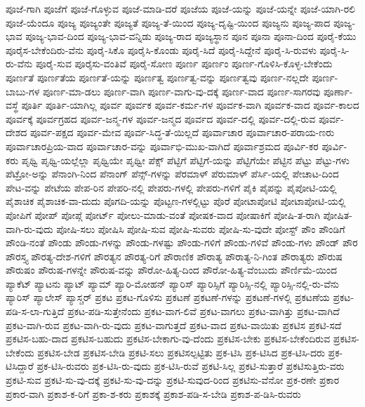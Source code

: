 {ಪೂಜೆ-ಗಾಗಿ
ಪೂಜೆಗೆ
ಪೂಜೆ-ಗೊಳ್ಳುವ
ಪೂಜೆ-ಮಾಡಿ-ದರೆ
ಪೂಜೆಯ
ಪೂಜೆ-ಯನ್ನು
ಪೂಜೆ-ಯನ್ನೇ
ಪೂಜೆ-ಯಾಗಿ-ರಲಿ
ಪೂಜೆ-ಯೆಂದೂ
ಪೂಜ್ಯ
ಪೂಜ್ಯಂತೇ
ಪೂಜ್ಯತೆ
ಪೂಜ್ಯ-ತೆ-ಯಿಂದ
ಪೂಜ್ಯ-ದೃಷ್ಟಿ-ಯಿಂದ
ಪೂಜ್ಯನು
ಪೂಜ್ಯ-ಪಾದ
ಪೂಜ್ಯ-ಭಾವ
ಪೂಜ್ಯ-ಭಾವ-ದಿಂದ
ಪೂಜ್ಯ-ಭಾವ-ವನ್ನಿಡು
ಪೂಜ್ಯ-ರಾದ
ಪೂಜ್ಯಸ್ಥಾನ
ಪೂನ
ಪೂನಾ
ಪೂನಾ-ದಿಂದ
ಪೂರೈ-ಕೆಯು
ಪೂರೈಸ-ಬೇಕೆಂದಿರು-ವೆನು
ಪೂರೈ-ಸಿಕೊ
ಪೂರೈಸಿ-ಕೊಂಡು
ಪೂರೈ-ಸಿದೆ
ಪೂರೈ-ಸಿದ್ದೇನೆ
ಪೂರೈ-ಸಿ-ರುವಳು
ಪೂರೈ-ಸಿ-ರು-ವೆನು
ಪೂರೈ-ಸುವ
ಪೂರೈಸು-ವಂತಿವೆ
ಪೂರೈ-ಸೋಣ
ಪೂರ್ಣ
ಪೂರ್ಣಂ
ಪೂರ್ಣ-ಗೊಳಿಸಿ-ಕೊಳ್ಳ-ಬೇಕೆಂದು
ಪೂರ್ಣತೆ
ಪೂರ್ಣತೆಯ
ಪೂರ್ಣತೆ-ಯನ್ನು
ಪೂರ್ಣತ್ವ
ಪೂರ್ಣತ್ವ-ವನ್ನು
ಪೂರ್ಣತ್ವವು
ಪೂರ್ಣ-ನಲ್ಲದೇ
ಪೂರ್ಣ-ಬಾಬು-ಗಳ
ಪೂರ್ಣ-ಮಾ-ಡಲು
ಪೂರ್ಣ-ವಾಗಿ
ಪೂರ್ಣ-ವಾಗು-ವು-ದಕ್ಕೆ
ಪೂರ್ಣ-ವಾದ
ಪೂರ್ಣ-ಸಾಗರವು
ಪೂರ್ಣಾ-ವಸ್ಥೆ
ಪೂರ್ತಿ
ಪೂರ್ತಿ-ಯಾಗಿಲ್ಲ
ಪೂರ್ವ
ಪೂರ್ವಕ
ಪೂರ್ವ-ಕರ್ಮ-ಗಳ
ಪೂರ್ವಕ-ವಾಗಿ
ಪೂರ್ವಕ-ವಾದ
ಪೂರ್ವ-ಕಾಲದ
ಪೂರ್ವಕ್ಕೆ
ಪೂರ್ವಗ್ರಹದ
ಪೂರ್ವ-ಜನ್ಮ-ಗಳ
ಪೂರ್ವ-ಜನ್ಮದ
ಪೂರ್ವದ
ಪೂರ್ವ-ದಲ್ಲಿ
ಪೂರ್ವ-ದಲ್ಲಿ-ರುವ
ಪೂರ್ವ-ದೇಶದ
ಪೂರ್ವ-ಪಕ್ಷದ
ಪೂರ್ವ-ಮೇವ
ಪೂರ್ವ-ಸಿದ್ಧ-ತೆ-ಯಿಲ್ಲದೆ
ಪೂರ್ವಾಚಾರ
ಪೂರ್ವಾಚಾರ-ಪರಾಯ-ಣರು
ಪೂರ್ವಾಚಾರಪ್ರಿಯ-ವಾದ
ಪೂರ್ವಾಚಾರ-ವನ್ನು
ಪೂರ್ವಾಭಿ-ಮುಖ-ವಾಗಿದೆ
ಪೂರ್ವಾಶ್ರಮದ
ಪೂರ್ವಿ-ಕರ
ಪೂರ್ವಿ-ಕರು
ಪೃಥ್ವಿ
ಪೃಥ್ವಿ-ಯಲ್ಲೆಲ್ಲಾ
ಪೃಥ್ವಿಯೇ
ಪೃಥ್ವೀ
ಪೆಕ್ಸ್
ಪೆಟ್ಟಿಗೆ
ಪೆಟ್ಟಿಗೆ-ಯನ್ನು
ಪೆಟ್ಟಿಗೆಯೇ
ಪೆಟ್ಟಿನ
ಪೆಟ್ಟು
ಪೆಟ್ಟು-ಗಳು
ಪೆಟ್ರೋ-ಅನ್ನು
ಪೆನಾಂಗಿ-ನಿಂದ
ಪೆನಾಂಗ್
ಪೆನ್ಸ್-ಗಳನ್ನು
ಪೆರಮಾಳ್
ಪೆರುಮಾಳ್
ಪೆರ್ಸಿ-ಯಲ್ಲಿ
ಪೇಚಾಟ-ದಿಂದ
ಪೇಟ-ವನ್ನು
ಪೇಟೆಯ
ಪೇಪ-ರಿನ
ಪೇಪರಿ-ನಲ್ಲಿ
ಪೇಪರು-ಗಳಲ್ಲಿ
ಪೇಪರು-ಗಳಿಗೆ
ಪೈಕಿ
ಪೈಪನ್ನು
ಪೈಪೋಟಿ-ಯಲ್ಲಿ
ಪೈಶಾಚಿಕ
ಪೈಶಾಚಿಕ-ವಾ-ದುದು
ಪೊಗದಿ-ಯನ್ನು
ಪೊಟ್ಟಣ-ಗಳಲ್ಲಿಟ್ಟು
ಪೊರೆ
ಪೋಟಾಪೋಟಿ
ಪೋಟಾಪೋಟಿ-ಯಲ್ಲಿ
ಪೋಪಿಗೆ
ಪೋಪ್
ಪೋಪ್ಗೆ
ಪೋರ್ಟ್
ಪೋಲು-ಮಾಡು-ವಂತೆ
ಪೋಷಕ-ವಾದ
ಪೋಷಾಕಿಗೆ
ಪೋಷಿ-ತ-ರಾಗಿ
ಪೋಷಿತ-ವಾಗಿ-ರು-ವುದು
ಪೋಷಿ-ಸಲು
ಪೋಷಿಸಿ
ಪೋಷಿ-ಸುವ
ಪೋಷಿ-ಸುವರು
ಪೋಷಿ-ಸು-ವುದೇ
ಪೋಸ್ಟ್
ಪೌಂ
ಪೌಂಡಿಗೆ
ಪೌಂಡಿ-ನಂತೆ
ಪೌಂಡು
ಪೌಂಡು-ಗಳನ್ನು
ಪೌಂಡು-ಗಳಷ್ಟು
ಪೌಂಡು-ಗಳಿಗೆ
ಪೌಂಡು-ಗಳಿವೆ
ಪೌಂಡು-ಗಳು
ಪೌಂಡ್
ಪೌರ
ಪೌರಸ್ತ್ಯ
ಪೌರತ್ಯ-ದೇಶ-ಗಳಿಗೆ
ಪೌರತ್ಯನ
ಪೌರತ್ಯ-ರಿಗೆ
ಪೌರಾಣಿಕ
ಪೌರಾತ್ಯ
ಪೌರಾತ್ಯ-ನಿ-ಗಿಂತ
ಪೌರಾತ್ಯರು
ಪೌರುಷ
ಪೌರುಷಂ
ಪೌರುಷ-ಗಳನ್ನೇ
ಪೌರುಷ-ವನ್ನು
ಪೌರೋ-ಹಿತ್ಯ-ದಿಂದ
ಪೌರೋ-ಹಿತ್ಯ-ವೆಂಬುದು
ಪೌರ್ಣಿಮೆ-ಯಿಂದ
ಪ್ಯಾಕೆಟ್
ಪ್ಯಾಟನು
ಪ್ಯಾಟ್
ಪ್ಯಾಮ್
ಪ್ಯಾರಿ-ಮೋಹನ್
ಪ್ಯಾರಿಸ್
ಪ್ಯಾರಿಸ್ಸಿಗೆ
ಪ್ಯಾರಿಸ್ಸಿ-ನಲ್ಲಿ
ಪ್ಯಾರಿಸ್ಸಿ-ನಲ್ಲಿ-ರು-ವೆನು
ಪ್ಯಾರಿಸ್
ಪ್ಯಾಲೇಸ್
ಪ್ಯಾಸ್ಚರ್
ಪ್ರಕಟ
ಪ್ರಕಟ-ಗೊಳಿಸು
ಪ್ರಕಟಣೆ
ಪ್ರಕಟಣೆ-ಗಳನ್ನು
ಪ್ರಕಟಣೆ-ಗಳಲ್ಲಿ
ಪ್ರಕಟಣೆಯ
ಪ್ರಕಟ-ಪಡಿ-ಸ-ಲಾ-ಗುತ್ತಿದೆ
ಪ್ರಕಟ-ಪಡಿ-ಸುತ್ತೇನೆಂದು
ಪ್ರಕಟ-ವಾಗ-ಲಿವೆ
ಪ್ರಕಟ-ವಾಗಲು
ಪ್ರಕಟ-ವಾಗಿತ್ತು
ಪ್ರಕಟ-ವಾಗಿದೆ
ಪ್ರಕಟ-ವಾಗಿ-ರುವ
ಪ್ರಕಟ-ವಾಗಿ-ರು-ವುದು
ಪ್ರಕಟ-ವಾಗುತ್ತದೆ
ಪ್ರಕಟ-ವಾದ
ಪ್ರಕಟ-ವಾಯಿತು
ಪ್ರಕಟಿಸ
ಪ್ರಕಟಿ-ಸದೆ
ಪ್ರಕಟಿಸ-ಬಹು-ದಾದ
ಪ್ರಕಟಿಸ-ಬಹುದು
ಪ್ರಕಟಿಸ-ಬೇಕಾಗು-ವು-ದೆಂದು
ಪ್ರಕಟಿಸ-ಬೇಕು
ಪ್ರಕಟಿಸ-ಬೇಕೆಂದಿರುವ
ಪ್ರಕಟಿಸ-ಬೇಕೆಂದು
ಪ್ರಕಟಿಸ-ಬೇಡ
ಪ್ರಕಟಿಸ-ಬೇಡಿ
ಪ್ರಕಟಿ-ಸಲು
ಪ್ರಕಟಿಸಲ್ಪಟ್ಟಿತು
ಪ್ರಕ-ಟಿಸಿ
ಪ್ರಕ-ಟಿಸಿದ
ಪ್ರಕ-ಟಿಸಿ-ದರು
ಪ್ರಕ-ಟಿಸಿದ್ದಾರೆ
ಪ್ರಕ-ಟಿಸಿ-ರುವರು
ಪ್ರಕ-ಟಿಸಿ-ರು-ವುದು
ಪ್ರಕ-ಟಿಸಿ-ರುವೆ
ಪ್ರಕಟಿ-ಸಿಲ್ಲ
ಪ್ರಕಟಿ-ಸುತ್ತಾರೆ
ಪ್ರಕಟಿಸುತ್ತಿರು-ವರು
ಪ್ರಕಟಿ-ಸುವ
ಪ್ರಕಟಿ-ಸು-ವು-ದಕ್ಕೆ
ಪ್ರಕಟಿ-ಸು-ವು-ದನ್ನು
ಪ್ರಕಟಿ-ಸುವುದ-ರಿಂದ
ಪ್ರಕಟಿಸು-ವೆನೋ
ಪ್ರಕ-ರಣೇ
ಪ್ರಕಾರ
ಪ್ರಕಾರ-ವಾಗಿ
ಪ್ರಕಾಶ-ಕ-ರಿಗೆ
ಪ್ರಕಾ-ಶ-ಕರು
ಪ್ರಕಾಶಕ್ಕೆ
ಪ್ರಕಾಶ-ಪಡಿ-ಸ-ಬೇಡಿ
ಪ್ರಕಾಶ-ಪ-ಡಿಸಿ-ರುವರು
}
